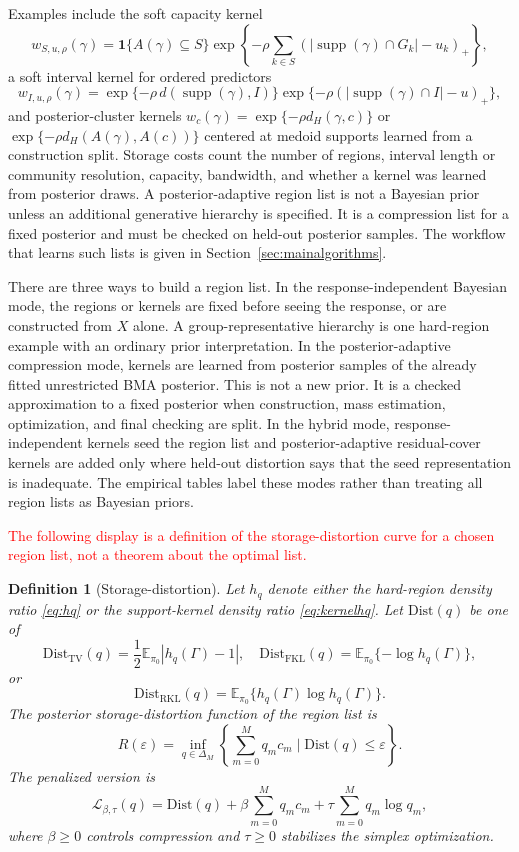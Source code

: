 \documentclass[twoside,11pt]{article}
\newtheorem{definition}{Definition}
\newcommand{\E}{\mathbb{E}}
\newcommand{\ind}{\mathbf{1}}
\newcommand{\TV}{\operatorname{TV}}
\newcommand{\supp}{\operatorname{supp}}
\newcommand{\rev}[1]{\textcolor{red}{#1}}
\begin{document}
Examples include the soft capacity kernel
\[
w_{S,u,\rho}(\gamma) = \ind\{A(\gamma)\subseteq S\} \exp\!\left\{-\rho\sum_{k\in S}(|\supp(\gamma)\cap G_k|-u_k)_+\right\},
\]
a soft interval kernel for ordered predictors
\[
w_{I,u,\rho}(\gamma) = \exp\{-\rho\,d(\supp(\gamma),I)\} \exp\{-\rho(|\supp(\gamma)\cap I|-u)_+\},
\]
and posterior-cluster kernels \(w_c(\gamma)=\exp\{-\rho d_H(\gamma,c)\}\) or \(\exp\{-\rho d_H(A(\gamma),A(c))\}\) centered at medoid supports learned from a construction split. Storage costs count the number of regions, interval length or community resolution, capacity, bandwidth, and whether a kernel was learned from posterior draws. A posterior-adaptive region list is not a Bayesian prior unless an additional generative hierarchy is specified. It is a compression list for a fixed posterior and must be checked on held-out posterior samples. The workflow that learns such lists is given in Section~\ref{sec:mainalgorithms}.

There are three ways to build a region list. In the response-independent Bayesian mode, the regions or kernels are fixed before seeing the response, or are constructed from \(X\) alone. A group-representative hierarchy is one hard-region example with an ordinary prior interpretation. In the posterior-adaptive compression mode, kernels are learned from posterior samples of the already fitted unrestricted BMA posterior. This is not a new prior. It is a checked approximation to a fixed posterior when construction, mass estimation, optimization, and final checking are split. In the hybrid mode, response-independent kernels seed the region list and posterior-adaptive residual-cover kernels are added only where held-out distortion says that the seed representation is inadequate. The empirical tables label these modes rather than treating all region lists as Bayesian priors.

\rev{The following display is a definition of the storage-distortion curve for a chosen region list, not a theorem about the optimal list.}
\begin{definition}[Storage-distortion]
\label{def:posteriorratedistortion}
Let \(h_q\) denote either the hard-region density ratio \eqref{eq:hq} or the support-kernel density ratio \eqref{eq:kernelhq}. Let \(\mathrm{Dist}(q)\) be one of
\[
\mathrm{Dist}_{\TV}(q) = \frac12\E_{\pi_0}|h_q(\Gamma)-1|, \quad \mathrm{Dist}_{\mathrm{FKL}}(q) = \E_{\pi_0}\{-\log h_q(\Gamma)\},
\]
or
\[
\mathrm{Dist}_{\mathrm{RKL}}(q) = \E_{\pi_0}\{h_q(\Gamma)\log h_q(\Gamma)\}.
\]
The posterior storage-distortion function of the region list is
\begin{equation}
R(\varepsilon) = \inf_{q\in\Delta_M} \left\{ \sum_{m=0}^M q_m c_m \mid \mathrm{Dist}(q)\le\varepsilon \right\}. \label{eq:ratedistortion}
\end{equation}
The penalized version is
\begin{equation}
\mathcal L_{\beta,\tau}(q) = \mathrm{Dist}(q) + \beta\sum_{m=0}^M q_m c_m + \tau\sum_{m=0}^M q_m\log q_m, \label{eq:penalizedRD}
\end{equation}
where $\beta\ge0$ controls compression and $\tau\ge0$ stabilizes the simplex optimization.
\end{definition}
\end{document}

